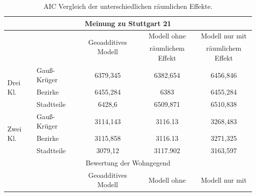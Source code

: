 \documentclass{Vorlage}
\begin{document}
\begin{table}[h]
\centering
\caption{AIC Vergleich der unterschiedlichen räumlichen Effekte.}
\label{stepAIC}
\begin{tabular}{llccc}
\hline \hline
\multicolumn{5}{c}{Meinung zu Stuttgart 21}                                                                                                                                            \\ \hline
                          & \multicolumn{1}{l|}{}             & \multicolumn{1}{c|}{\multirow{2}{*}{Geoadditives Modell}} & \multicolumn{1}{c|}{Modell ohne}       & Modell nur mit    \\
                          & \multicolumn{1}{l|}{}             & \multicolumn{1}{c|}{}                                     & \multicolumn{1}{c|}{räumlichem Effekt} & räumlichem Effekt \\ \hline
\multirow{3}{*}{Drei Kl.} & \multicolumn{1}{l|}{Gauß-Krüger} & \multicolumn{1}{c|}{6379,345}                             & \multicolumn{1}{c|}{6382,654}          & 6456,846          \\
                          & \multicolumn{1}{l|}{Bezirke}      & \multicolumn{1}{c|}{6455,284}                             & \multicolumn{1}{c|}{6383}              & 6455,284          \\
                          & \multicolumn{1}{l|}{Stadtteile}   & \multicolumn{1}{c|}{6428,6}                               & \multicolumn{1}{c|}{6509,871}          & 6510,838          \\ \hline
\multirow{3}{*}{Zwei Kl.} & \multicolumn{1}{l|}{Gauß-Krüger} & \multicolumn{1}{c|}{3114,143}                             & \multicolumn{1}{c|}{3116.13}           & 3268,483          \\
                          & \multicolumn{1}{l|}{Bezirke}      & \multicolumn{1}{c|}{3115,858}                             & \multicolumn{1}{c|}{3116.13}           & 3271,325          \\
                          & \multicolumn{1}{l|}{Stadtteile}   & \multicolumn{1}{c|}{3079,12}                              & \multicolumn{1}{c|}{3117.902}          & 3163,597          \\ \hline
\multicolumn{5}{c}{Bewertung der Wohngegend}                                                                                                                                           \\ \hline
                          & \multicolumn{1}{l|}{}             & \multicolumn{1}{c|}{\multirow{2}{*}{Geoadditives Modell}} & \multicolumn{1}{c|}{Modell ohne}       & Modell nur mit    \\

\end{tabular}
\end{table}
\end{document}
